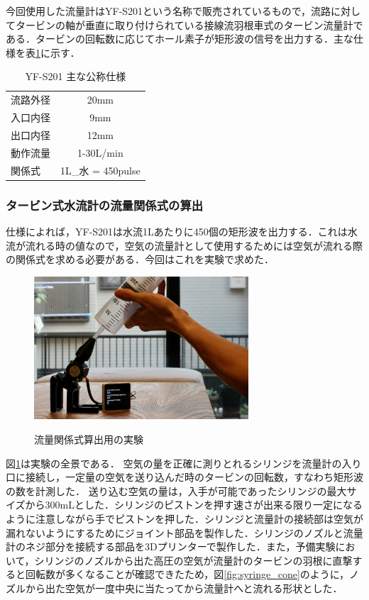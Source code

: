 今回使用した流量計はYF-S201という名称で販売されているもので，流路に対してタービンの軸が垂直に取り付けられている接線流羽根車式のタービン流量計である．タービンの回転数に応じてホール素子が矩形波の信号を出力する．主な仕様を表\ref{tb:YFS201_specsheet}に示す．

\begin{table}[h]
  \begin{center}
  \caption{YF-S201 主な公称仕様}
  \label{tb:YFS201_specsheet}
    \begin{tabular}{lc}
      流路外径 & 20mm \\
      入口内径 & 9mm \\
      出口内径 & 12mm \\
      動作流量 & 1-30L/min \\
      関係式 & 1L_{水} = 450pulse
    \end{tabular}
  \end{center}
\end{table}

\subsubsection{タービン式水流計の流量関係式の算出}

仕様によれば，YF-S201は水流1Lあたりに450個の矩形波を出力する．これは水流が流れる時の値なので，空気の流量計として使用するためには空気が流れる際の関係式を求める必要がある．今回はこれを実験で求めた．

\begin{figure}[h]
  \begin{center}
    \label{fig:flowsensor_calibrate}
    \includegraphics[width=8cm]{fig/flowsensor_calibrate.png}
    \caption{流量関係式算出用の実験}
  \end{center}
\end{figure}

図\ref{fig:flowsensor_calibrate}は実験の全景である．
空気の量を正確に測りとれるシリンジを流量計の入り口に接続し，一定量の空気を送り込んだ時のタービンの回転数，すなわち矩形波の数を計測した．
送り込む空気の量は，入手が可能であったシリンジの最大サイズから300mLとした．シリンジのピストンを押す速さが出来る限り一定になるように注意しながら手でピストンを押した．シリンジと流量計の接続部は空気が漏れないようにするためにジョイント部品を製作した．シリンジのノズルと流量計のネジ部分を接続する部品を3Dプリンターで製作した．また，予備実験において，シリンジのノズルから出た高圧の空気が流量計のタービンの羽根に直撃すると回転数が多くなることが確認できたため，図\ref{fig:syringe_cone}のように，ノズルから出た空気が一度中央に当たってから流量計へと流れる形状とした．


